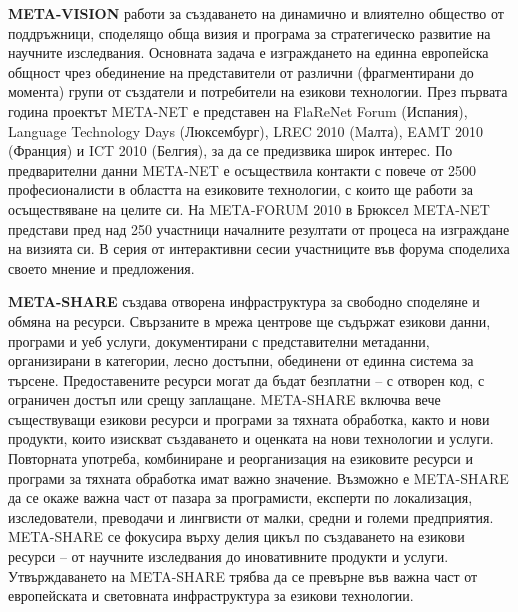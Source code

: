 \documentclass[]{../../metanetpaper}
\begin{document}
\begin{multicols}{2}
\textbf{META-VISION} работи за създаването на динамично и влиятелно
общество от поддръжници, споделящо обща визия и програма за
стратегическо развитие на научните изследвания. Основната задача е
изграждането на единна европейска общност чрез обединение на
представители от различни (фрагментирани до момента) групи от
създатели и потребители на езикови технологии. През първата година
проектът META-NET е представен на FlaReNet Forum (Испания), Language
Technology Days (Люксембург), LREC 2010
(Mалта), EAMT 2010 (Франция) и ICT 2010 (Белгия), за да се предизвика
широк интерес.  По предварителни данни META-NET е осъществила контакти
с повече от 2500 професионалисти в областта на езиковите технологии, с
които ще работи за осъществяване на целите си. На META-FORUM 2010 в
Брюксел META-NET представи пред над 250 участници началните резултати
от процеса на изграждане на визията си. В серия от интерактивни сесии
участниците във форума споделиха своето мнение и предложения.

\textbf{META-SHARE} създава отворена инфраструктура за свободно
споделяне и обмяна на ресурси. Свързаните в мрежа центрове ще съдържат
езикови данни, програми и уеб услуги, документирани с представителни
метаданни, организирани в категории, лесно достъпни, обединени от
единна система за търсене.  Предоставените ресурси могат да бъдат
безплатни -- с отворен код, с ограничен достъп или срещу
заплащане. META-SHARE включва вече съществуващи езикови ресурси и
програми за тяхната обработка, както и нови продукти, които изискват
създаването и оценката на нови технологии и услуги.  Повторната
употреба, комбиниране и реорганизация на езиковите ресурси и програми
за тяхната обработка имат важно значение. Възможно е META-SHARE да се
окаже важна част от пазара за програмисти, експерти по локализация,
изследователи, преводачи и лингвисти от малки, средни и големи
предприятия. META-SHARE се фокусира върху делия цикъл по създаването
на езикови ресурси – от научните изследвания до иновативните продукти
и услуги. Утвърждаването на META-SHARE трябва да се превърне във важна
част от европейската и световната инфраструктура за езикови
технологии.


\end{multicols}
\end{document}
